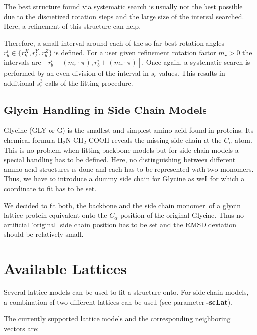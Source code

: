 \documentclass{article}
\newcommand{\CA}{$C_\alpha$}
\begin{document}
The best structure found via systematic search is usually not the best possible
due to the discretized rotation steps and the large size of the interval
searched. Here, a refinement of this structure can help.

Therefore, a small interval around each of the so far best rotation angles
$r^i_b \in \{r^X_b, r^Y_b, r^Z_b\}$ is defined. For a user given
refinement rotation factor $m_r>0$ the intervals are $[r^i_b-(m_r\cdot\pi),
r^i_b+(m_r\cdot\pi)]$. Once again, a systematic search is performed by an even
division of the interval in $s_r$ values. This results in additional $s_r^3$
calls of the fitting procedure.


\subsection{Glycin Handling in Side Chain Models}
\label{sec:glycin}

Glycine (GLY or G) is the smallest and simplest amino acid found in proteins.
Its chemical formula H$_2$N-CH$_2$-COOH reveals the missing side chain at the
\CA{} atom. This is no problem when fitting backbone models but for side chain
models a special handling has to be defined. Here, no distinguishing between
different amino acid structures is done and each has to be represented with two
monomers. Thus, we have to introduce a dummy side chain for Glycine as well for
which a coordinate to fit has to be set.

We decided to fit both, the backbone and the side chain monomer, of a glycin
lattice protein equivalent onto the \CA-position of the original Glycine. Thus
no artificial 'original' side chain position has to be set and the RMSD
deviation should be relatively small.


\clearpage
\section{Available Lattices}
\label{sec:lat}

Several lattice models can be used to fit a structure onto. For side chain
models, a combination of two different lattices can be used (see parameter
\mbox{\bfseries -scLat}).

\vspace{0.5em}
The currently supported lattice models and the corresponding neighboring
vectors are:
\end{document}
